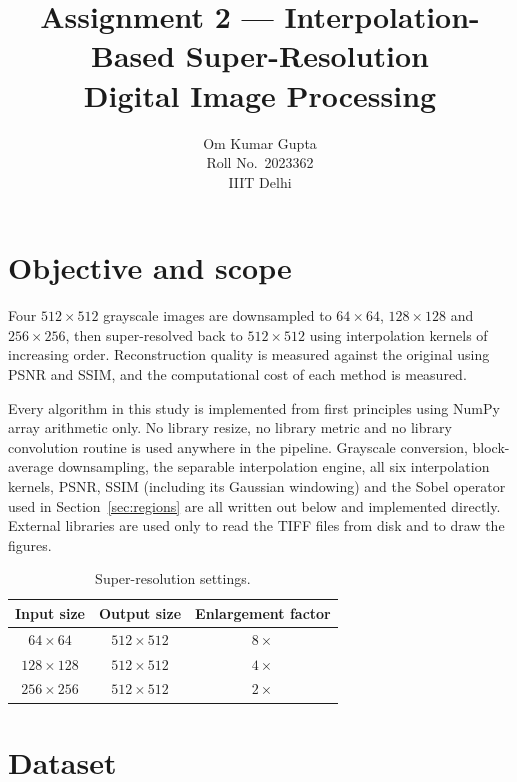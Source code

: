 \documentclass[11pt,a4paper]{article}
\title{\vspace{-1.5cm}\textbf{Assignment 2 --- Interpolation-Based Super-Resolution}\\
\large Digital Image Processing}
\author{Om Kumar Gupta \\ Roll No.\ 2023362 \\ IIIT Delhi}
\begin{document}
\maketitle
\thispagestyle{empty}

\vspace{-1cm}
\tableofcontents
\clearpage

\section{Objective and scope}

Four $512\times512$ grayscale images are downsampled to $64\times64$, $128\times128$ and
$256\times256$, then super-resolved back to $512\times512$ using interpolation kernels of
increasing order. Reconstruction quality is measured against the original using PSNR and
SSIM, and the computational cost of each method is measured.

Every algorithm in this study is implemented from first principles using NumPy array
arithmetic only. No library resize, no library metric and no library convolution routine is
used anywhere in the pipeline. Grayscale conversion, block-average downsampling, the
separable interpolation engine, all six interpolation kernels, PSNR, SSIM (including its
Gaussian windowing) and the Sobel operator used in Section~\ref{sec:regions} are all written
out below and implemented directly. External libraries are used only to read the TIFF files
from disk and to draw the figures.

\begin{table}[H]
\centering
\caption{Super-resolution settings.}
\label{tab:settings}
\begin{tabular}{ccc}
\toprule
Input size & Output size & Enlargement factor \\
\midrule
$64\times64$   & $512\times512$ & $8\times$ \\
$128\times128$ & $512\times512$ & $4\times$ \\
$256\times256$ & $512\times512$ & $2\times$ \\
\bottomrule
\end{tabular}
\end{table}

\section{Dataset}
\end{document}
